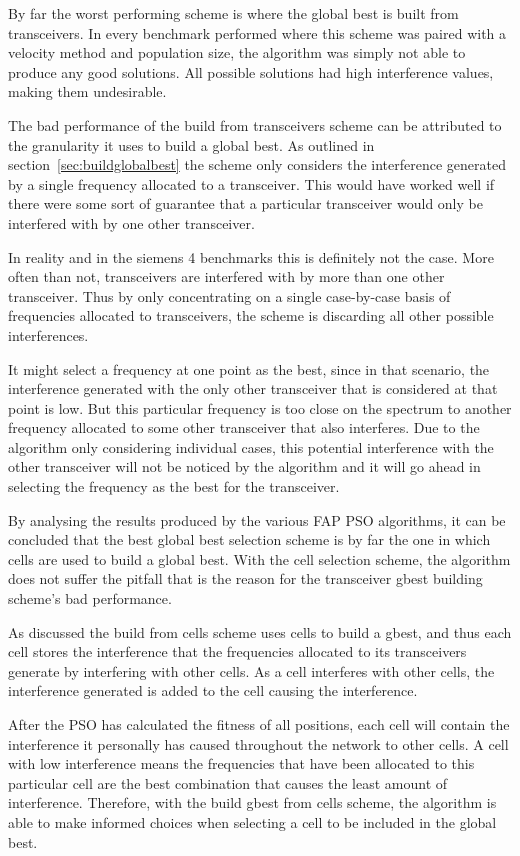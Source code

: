 By far the worst performing scheme is where the global best is built from transceivers. In every benchmark performed where this scheme was paired with a velocity method and population size, the algorithm was simply not able to produce any good solutions. All possible solutions had high interference values, making them undesirable.

The bad performance of the build from transceivers scheme can be attributed to the granularity it uses to build a global best. As outlined in section~\ref{sec:buildglobalbest} the scheme only considers the interference generated by a single frequency allocated to a transceiver. This would have worked well if there were some sort of guarantee that a particular transceiver would only be interfered with by one other transceiver.

In reality and in the siemens 4 benchmarks this is definitely not the case. More often than not, transceivers are interfered with by more than one other transceiver. Thus by only concentrating on a single case-by-case basis of frequencies allocated to transceivers, the scheme is discarding all other possible interferences. 

It might select a frequency at one point as the best, since in that scenario, the interference generated with the only other transceiver that is considered at that point is low. But this particular frequency is too close on the spectrum to another frequency allocated to some other transceiver that also interferes. Due to the algorithm only considering individual cases, this potential interference with the other transceiver will not be noticed by the algorithm and it will go ahead in selecting the frequency as the best for the transceiver.

By analysing the results produced by the various FAP PSO algorithms, it can be concluded that the best global best selection scheme is by far the one in which cells are used to build a global best. With the cell selection scheme, the algorithm does not suffer the pitfall that is the reason for the transceiver gbest building scheme's bad performance.

As discussed the build from cells scheme uses cells to build a gbest, and thus each cell stores the interference that the frequencies allocated to its transceivers generate by interfering with other cells. As a cell interferes with other cells, the interference generated is added to the cell causing the interference.

After the PSO has calculated the fitness of all positions, each cell will contain the interference it personally has caused throughout the network to other cells. A cell with low interference means the frequencies that have been allocated to this particular cell are the best combination that causes the least amount of interference. Therefore, with the build gbest from cells scheme, the algorithm is able to make informed choices when selecting a cell to be included in the global best. 
